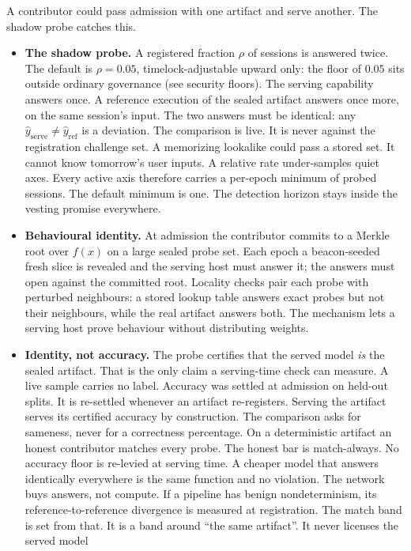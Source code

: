 \documentclass[11pt]{article}
\begin{document}
A contributor could pass admission with one artifact and serve
another. The shadow probe catches this.

\begin{itemize}
\item \textbf{The shadow probe.} A registered fraction $\rho$ of sessions
is answered twice. The default is $\rho=0.05$, timelock-adjustable
upward only: the floor of $0.05$ sits outside ordinary governance
(see security floors).
The serving capability answers once. A reference execution of the
sealed artifact answers once more, on the same session's input.
The two answers must be identical: any
$\hat y_{\mathrm{serve}} \neq \hat y_{\mathrm{ref}}$ is a
deviation. The comparison is live. It is
never against the registration challenge set. A memorizing
lookalike could pass a stored set. It cannot know tomorrow's user
inputs. A relative rate under-samples quiet axes. Every active
axis therefore carries a per-epoch minimum of probed sessions.
The default minimum is one. The detection horizon stays inside
the vesting promise everywhere.
\item \textbf{Behavioural identity.} At admission the
contributor commits to a Merkle root over $f(x)$ on a large
sealed probe set. Each epoch a beacon-seeded fresh slice is
revealed and the serving host must answer it; the answers must
open against the committed root. Locality checks pair each probe
with perturbed neighbours: a stored lookup table answers exact
probes but not their neighbours, while the real artifact answers
both. The mechanism lets a serving host prove behaviour without
distributing weights.
\item \textbf{Identity, not accuracy.} The probe certifies that
the served model \emph{is} the sealed artifact. That is the only
claim a serving-time check can measure. A live sample carries no
label. Accuracy was settled at admission on held-out splits. It
is re-settled whenever an artifact re-registers. Serving the
artifact serves its certified accuracy by construction. The
comparison asks for sameness, never for a correctness percentage.
On a deterministic artifact an honest contributor matches every
probe. The honest bar is match-always. No accuracy floor is
re-levied at serving time. A cheaper model that answers
identically everywhere is the same function and no violation.
The network buys answers, not compute. If a pipeline has benign
nondeterminism, its reference-to-reference divergence is measured
at registration. The match band is set from that. It is a band
around ``the same artifact''. It never licenses the served model

\end{itemize}
\end{document}
